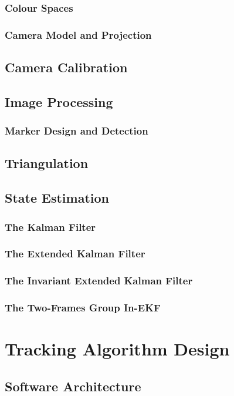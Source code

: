 \subsubsection{Colour Spaces}
\subsubsection{Camera Model and Projection}
\label{sec:CameraModelProjection}
\subsection{Camera Calibration}
\subsection{Image Processing}
\subsubsection{Marker Design and Detection}
\subsection{Triangulation}

\subsection{State Estimation}
\subsubsection{The Kalman Filter}
\subsubsection{The Extended Kalman Filter}
\subsubsection{The Invariant Extended Kalman Filter}
\subsubsection{The Two-Frames Group In-EKF}

\section{Tracking Algorithm Design}
\subsection{Software Architecture}


